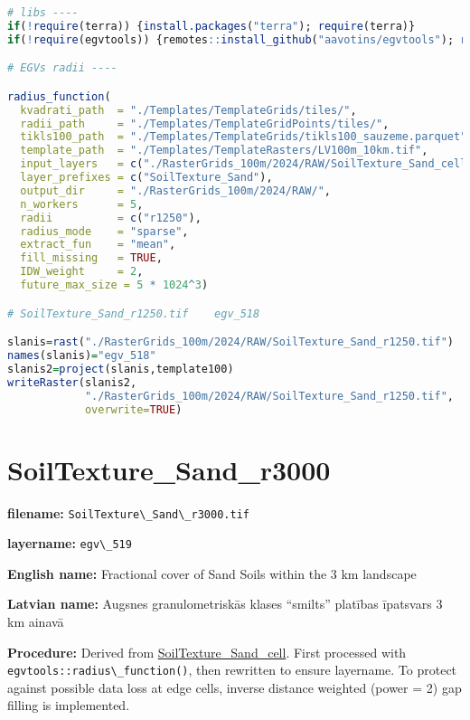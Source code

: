 \documentclass[
]{book}
\newcommand{\passthrough}[1]{#1}
\begin{document}
\begin{lstlisting}[language=R]
# libs ----
if(!require(terra)) {install.packages("terra"); require(terra)}
if(!require(egvtools)) {remotes::install_github("aavotins/egvtools"); require(egvtools)}

# EGVs radii ----

radius_function(
  kvadrati_path  = "./Templates/TemplateGrids/tiles/",
  radii_path     = "./Templates/TemplateGridPoints/tiles/",
  tikls100_path  = "./Templates/TemplateGrids/tikls100_sauzeme.parquet",
  template_path  = "./Templates/TemplateRasters/LV100m_10km.tif",
  input_layers   = c("./RasterGrids_100m/2024/RAW/SoilTexture_Sand_cell.tif"),
  layer_prefixes = c("SoilTexture_Sand"),
  output_dir     = "./RasterGrids_100m/2024/RAW/",
  n_workers      = 5,
  radii          = c("r1250"),
  radius_mode    = "sparse",
  extract_fun    = "mean",
  fill_missing   = TRUE,
  IDW_weight     = 2,
  future_max_size = 5 * 1024^3)

# SoilTexture_Sand_r1250.tif    egv_518

slanis=rast("./RasterGrids_100m/2024/RAW/SoilTexture_Sand_r1250.tif")
names(slanis)="egv_518"
slanis2=project(slanis,template100)
writeRaster(slanis2,
            "./RasterGrids_100m/2024/RAW/SoilTexture_Sand_r1250.tif",
            overwrite=TRUE)
\end{lstlisting}

\section{SoilTexture\_Sand\_r3000}\label{ch06.519}

\textbf{filename:} \passthrough{\lstinline!SoilTexture\_Sand\_r3000.tif!}

\textbf{layername:} \passthrough{\lstinline!egv\_519!}

\textbf{English name:} Fractional cover of Sand Soils within the 3 km landscape

\textbf{Latvian name:} Augsnes granulometriskās klases ``smilts'' platības īpatsvars 3 km ainavā

\textbf{Procedure:} Derived from \hyperref[ch06.516]{SoilTexture\_Sand\_cell}. First processed
with \passthrough{\lstinline!egvtools::radius\_function()!}, then rewritten to ensure layername. To protect against
possible data loss at edge cells, inverse distance weighted (power = 2) gap filling
is implemented.
\end{document}
